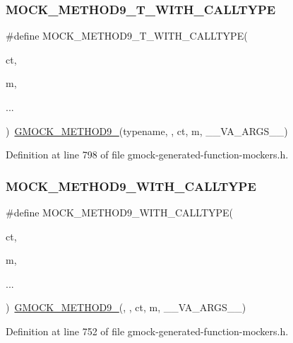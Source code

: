 \subsubsection{\texorpdfstring{M\+O\+C\+K\+\_\+\+M\+E\+T\+H\+O\+D9\+\_\+\+T\+\_\+\+W\+I\+T\+H\+\_\+\+C\+A\+L\+L\+T\+Y\+PE}{MOCK\_METHOD9\_T\_WITH\_CALLTYPE}}
{\footnotesize\ttfamily \#define M\+O\+C\+K\+\_\+\+M\+E\+T\+H\+O\+D9\+\_\+\+T\+\_\+\+W\+I\+T\+H\+\_\+\+C\+A\+L\+L\+T\+Y\+PE(\begin{DoxyParamCaption}\item[{}]{ct,  }\item[{}]{m,  }\item[{}]{... }\end{DoxyParamCaption})~\hyperlink{gmock-generated-function-mockers_8h_aa820171a19cc587c247dbe05cbffc55f}{G\+M\+O\+C\+K\+\_\+\+M\+E\+T\+H\+O\+D9\+\_\+}(typename, , ct, m, \+\_\+\+\_\+\+V\+A\+\_\+\+A\+R\+G\+S\+\_\+\+\_\+)}



Definition at line 798 of file gmock-\/generated-\/function-\/mockers.\+h.

\mbox{\label{gmock-generated-function-mockers_8h_a38494187d78c6a395f78c074d204f593}} 
\subsubsection{\texorpdfstring{M\+O\+C\+K\+\_\+\+M\+E\+T\+H\+O\+D9\+\_\+\+W\+I\+T\+H\+\_\+\+C\+A\+L\+L\+T\+Y\+PE}{MOCK\_METHOD9\_WITH\_CALLTYPE}}
{\footnotesize\ttfamily \#define M\+O\+C\+K\+\_\+\+M\+E\+T\+H\+O\+D9\+\_\+\+W\+I\+T\+H\+\_\+\+C\+A\+L\+L\+T\+Y\+PE(\begin{DoxyParamCaption}\item[{}]{ct,  }\item[{}]{m,  }\item[{}]{... }\end{DoxyParamCaption})~\hyperlink{gmock-generated-function-mockers_8h_aa820171a19cc587c247dbe05cbffc55f}{G\+M\+O\+C\+K\+\_\+\+M\+E\+T\+H\+O\+D9\+\_\+}(, , ct, m, \+\_\+\+\_\+\+V\+A\+\_\+\+A\+R\+G\+S\+\_\+\+\_\+)}



Definition at line 752 of file gmock-\/generated-\/function-\/mockers.\+h.

